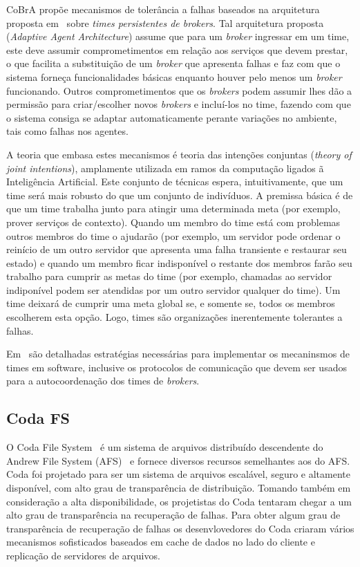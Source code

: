 CoBrA propõe mecanismos de tolerância a falhas baseados na arquitetura proposta em~\cite{kumar2000adaptive} sobre \emph{times persistentes de brokers}. Tal arquitetura proposta (\emph{Adaptive Agent Architecture}) assume que para um \emph{broker} ingressar em um time, este deve assumir comprometimentos em relação aos serviços que devem prestar, o que facilita a substituição de um \emph{broker} que apresenta falhas e faz com que o sistema forneça funcionalidades básicas enquanto houver pelo menos um \emph{broker} funcionando. Outros comprometimentos que os \emph{brokers} podem assumir lhes dão a permissão para criar/escolher novos \emph{brokers} e incluí-los no time, fazendo com que o sistema consiga se adaptar automaticamente perante variações no ambiente, tais como falhas nos agentes. 

A teoria que embasa estes mecanismos é teoria das intenções conjuntas (\emph{theory of joint intentions}), amplamente utilizada em ramos da computação ligados ã Inteligência Artificial. Este conjunto de técnicas espera, intuitivamente, que um time será mais robusto do que um conjunto de indivíduos. A premissa básica é de que um time trabalha junto para atingir uma determinada meta (por exemplo, prover serviços de contexto). Quando um membro do time está com problemas outros membros do time o ajudarão (por exemplo, um servidor pode ordenar o reinício de um outro servidor que apresenta uma falha transiente e restaurar seu estado) e quando um membro ficar indisponível o restante dos membros farão seu trabalho para cumprir as metas do time (por exemplo, chamadas ao servidor indiponível podem ser atendidas por um outro servidor qualquer do time). Um time deixará de cumprir uma meta global se, e somente se, todos os membros escolherem esta opção. Logo, times são organizações inerentemente tolerantes a falhas.

Em~\cite{kumar2000adaptive} são detalhadas estratégias necessárias para implementar os mecaninsmos de times em software, inclusive os protocolos de comunicação que devem ser usados para a autocoordenação dos times de \emph{brokers}.


\subsection{Coda FS} %
\label{sub:coda_fs}

O Coda File System~\cite{satyanarayanan1990coda} é um sistema de arquivos distribuído descendente do Andrew File System (AFS)~\cite{howard1988overview} e fornece diversos recursos semelhantes aos do AFS. Coda foi projetado para ser um sistema de arquivos escalável, seguro e altamente disponível, com alto grau de transparência de distribuição. Tomando também em consideração a alta disponibilidade, os projetistas do Coda tentaram chegar a um alto grau de transparência na recuperação de falhas. Para obter algum grau de transparência de recuperação de falhas os desenvlovedores do Coda criaram vários mecanismos sofisticados baseados em cache de dados no lado do cliente e replicação de servidores de arquivos.

